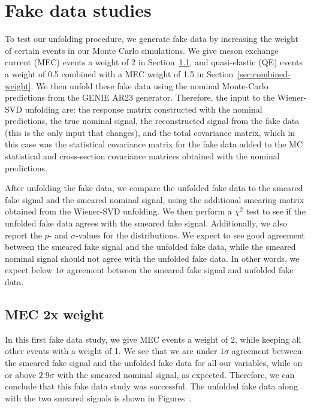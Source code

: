 \documentclass{article}
\begin{document}
\clearpage

\section{Fake data studies}

To test our unfolding procedure, we generate fake data by increasing the weight of certain events in 
our Monte Carlo simulations. We give meson exchange current (MEC) events a weight of 2 in Section~\ref{sec:mec-2x-weight},
and quasi-elastic (QE) events a weight of 0.5 combined with a MEC weight of 1.5 in Section~\ref{sec:combined-weight}. We then unfold these fake data
using the nominal Monte-Carlo predictions from the GENIE AR23 generator. Therefore, the input to the Wiener-SVD 
unfolding are: the response matrix constructed with the nominal predictions, the true nominal signal, 
the reconstructed signal from the fake data (this is the only input that changes), and the total covariance matrix, 
which in this case was the statistical covariance matrix for the fake data added to the MC statistical and cross-section
covariance matrices obtained with the nominal predictions. 

After unfolding the fake data, we compare the unfolded fake data to the smeared fake signal and the smeared 
nominal signal, using the additional smearing matrix obtained from the Wiener-SVD unfolding. We then perform 
a $\chi^2$ test to see if the unfolded fake data agrees with the smeared fake signal. Additionally, we also 
report the $p$- and $\sigma$-values for the distributions. We expect to see good agreement between the smeared 
fake signal and the unfolded fake data, while the smeared nominal signal should not agree with the unfolded fake data.
In other words, we expect below $1\sigma$ agreement between the smeared fake signal and unfolded fake data. 

\subsection{MEC 2x weight}\label{sec:mec-2x-weight}

In this first fake data study, we give MEC events a weight of 2, while keeping all other events with a weight of 1.
We see that we are under $1\sigma$ agreement between the smeared fake signal and the unfolded fake data for all 
our variables, while on or above $2.9\sigma$ with the smeared nominal signal, as expected. Therefore, we can 
conclude that this fake data study was successful. The unfolded fake data along with the two smeared signals 
is shown in Figures~.
\end{document}

